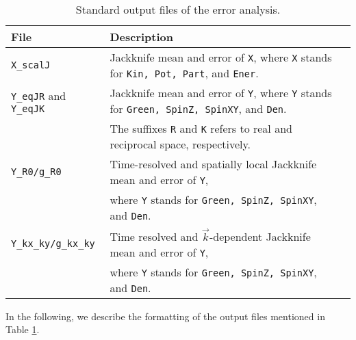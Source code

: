 %
\begin{table}[h]
   \begin{tabular}{@{} l l l @{}}\toprule
   File & Description \\\midrule
   \texttt{X\_scalJ} & Jackknife mean and error of \texttt{X}, where  \texttt{X} stands for \texttt{Kin, Pot, Part}, and \texttt{Ener}.\\
   \texttt{Y\_eqJR} and \texttt{Y\_eqJK} & Jackknife mean and error of \texttt{Y}, where \texttt{Y} stands for \texttt{Green, SpinZ, SpinXY}, and \texttt{Den}.\\
   & The suffixes \texttt{R} and \texttt{K} refers to real and reciprocal space, respectively.\\
   \texttt{Y\_R0/g\_R0} & Time-resolved and spatially local Jackknife mean and error of \texttt{Y},\\
   & where \texttt{Y} stands for \texttt{Green, SpinZ, SpinXY}, and \texttt{Den}.\\
   \texttt{Y\_kx\_ky/g\_kx\_ky} & Time resolved and $\vec{k}$-dependent Jackknife mean and error of \texttt{Y},\\
   & where \texttt{Y} stands for \texttt{Green, SpinZ, SpinXY}, and \texttt{Den}.\\\bottomrule
    \end{tabular}
   \caption{ Standard output files of the error analysis. \label{table:analysis_output}}
\end{table}
%
In the following, we describe the formatting of the output files mentioned in Table \ref{table:analysis_output}.
